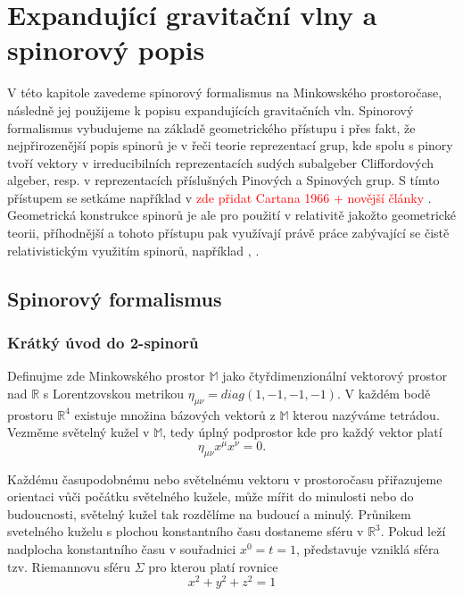 \newcommand{\Ab}{{\boldsymbol{A}}}
\newcommand{\Bb}{{\boldsymbol{B}}}
\newcommand{\Cb}{{\boldsymbol{C}}}
\newcommand{\Db}{{\boldsymbol{D}}}

\chapter{Expandující gravitační vlny a spinorový popis}
V této kapitole zavedeme spinorový formalismus na Minkowského prostoročase, následně jej použijeme k popisu expandujících
gravitačních vln. Spinorový formalismus vybudujeme na základě geometrického přístupu i přes fakt, že
nejpřirozenější popis spinorů je v řeči teorie reprezentací grup, kde spolu s pinory tvoří vektory v
irreducibilních reprezentacích sudých subalgeber Cliffordových algeber, resp. v reprezentacích příslušných
Pinových a Spinových grup. S tímto přístupem se setkáme například v \textcolor{red}{zde přidat Cartana 1966
+ novější články}
\cite{fecko_2006}. Geometrická konstrukce spinorů je ale pro použití v relativitě jakožto geometrické teorii,
příhodnější a tohoto přístupu pak využívají právě práce zabývající se čistě relativistickým využitím spinorů, například
\cite{penrose_rindler_1984}, \cite{doi:10.1142/5222}.
\section{Spinorový formalismus}
\subsection{Krátký úvod do 2-spinorů}
Definujme zde Minkowského prostor $\mathbb{M}$ jako čtyřdimenzionální vektorový prostor nad $\mathbb{R}$ s Lorentzovskou metrikou
$\eta_{\mu \nu} = diag(1, -1, -1, -1)$. V každém bodě prostoru $\mathbb{R}^4$ existuje množina bázových vektorů z $\mathbb{M}$ kterou
nazýváme tetrádou.
Vezměme světelný kužel v $\mathbb{M}$, tedy úplný podprostor kde pro každý vektor platí
\begin{equation}
    \eta_{\mu \nu} x^\mu x^\nu = 0.
\end{equation}

Každému časupodobnému nebo světelnému vektoru v prostoročasu přiřazujeme orientaci vůči počátku světelného
kužele, může mířit do minulosti nebo do budoucnosti, světelný kužel tak rozdělíme na budoucí a minulý.
Průnikem svetelného kuželu s plochou konstantního času dostaneme sféru v $\mathbb{R}^3$. Pokud leží nadplocha
konstantního času v souřadnici $x^0 = t =1$, představuje vzniklá sféra tzv. Riemannovu sféru $\Sigma$ pro kterou
platí rovnice
\begin{equation}
    x^2 + y^2 + z^2 = 1
\end{equation} 

